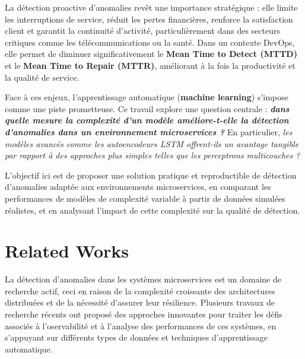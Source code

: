 \documentclass[conference]{IEEEtran}
\begin{document}
La détection proactive d’anomalies revêt une importance stratégique : elle limite les interruptions de service, réduit les pertes financières, renforce la satisfaction client et garantit la continuité d’activité, particulièrement dans des secteurs critiques comme les télécommunications ou la santé. Dans un contexte DevOps, elle permet de diminuer significativement le \cite{Morais2023_mttd_mttr} \textbf{Mean Time to Detect (MTTD)} et le \textbf{Mean Time to Repair (MTTR)}, améliorant à la fois la productivité et la qualité de service.

Face à ces enjeux, l’apprentissage automatique (\textbf{machine learning}) s’impose comme une piste prometteuse. Ce travail explore une question centrale : \textbf{\textit{dans quelle mesure la complexité d’un modèle améliore-t-elle la détection d’anomalies dans un environnement microservices ?}} En particulier, \textit{les modèles avancés comme les autoencodeurs LSTM offrent-ils un avantage tangible par rapport à des approches plus simples telles que les perceptrons multicouches ?}

L’objectif ici est de proposer une solution pratique et reproductible de détection d’anomalies adaptée aux environnements microservices, en comparant les performances de modèles de complexité variable à partir de données simulées réalistes, et en analysant l’impact de cette complexité sur la qualité de détection.

\section{Related Works}
La détection d’anomalies dans les systèmes microservices est un domaine de recherche actif, ceci en raison de la complexité croissante des architectures distribuées et de la nécessité d’assurer leur résilience.
Plusieurs travaux de recherche récents ont proposé des approches innovantes pour traiter les défis associés à l'oservabilité et à l'analyse des performances de ces systèmes, en s’appuyant sur différents types de données et techniques d’apprentissage automatique.
\end{document}
